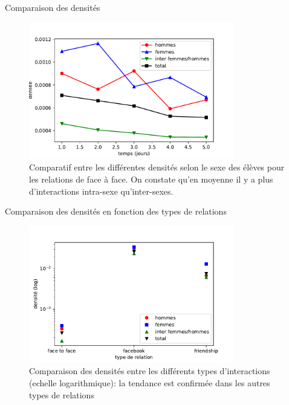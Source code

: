 \documentclass[15pt]{beamer}
\begin{document}
\begin{frame}{Comparaison des densités}
    \begin{figure}
        \centering
        \includegraphics[width=0.8\textwidth]{img/compfg.pdf}
        \caption{Comparatif entre les différentes densités selon le sexe des élèves pour les relations de face à face. On constate qu'en moyenne il y a plus d'interactions intra-sexe qu'inter-sexes.}
        \label{fig:my_label}
    \end{figure}
\end{frame}
    
\begin{frame}{Comparaison des densités en fonction des types de relations}
    
    \begin{figure}
        \centering
        \includegraphics[width=0.8\textwidth]{img/comparatif.pdf}
        \caption{Comparaison des densités entre les différents types d'interactions (echelle logarithmique): la tendance est confirmée dans les autres types de relations }
        \label{fig:my_label}
    \end{figure}
\end{frame}
\end{document}
